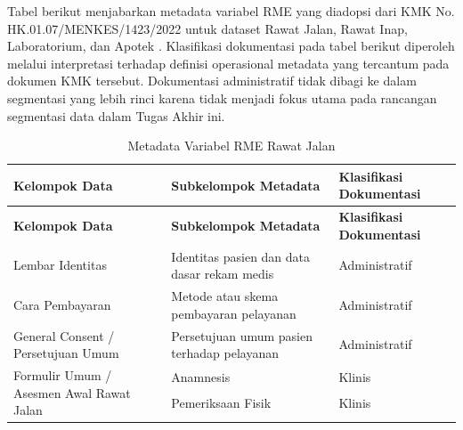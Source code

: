 \documentclass[bahasa, 12pt, a4paper, onecolumn, oneside, final]{report}
\begin{document}
Tabel berikut menjabarkan metadata variabel RME yang diadopsi dari KMK No. HK.01.07/MENKES/1423/2022 untuk dataset Rawat Jalan, Rawat Inap, Laboratorium, dan Apotek \autocite{kemenkes1423-2022}. Klasifikasi dokumentasi pada tabel berikut diperoleh melalui interpretasi terhadap definisi operasional metadata yang tercantum pada dokumen KMK tersebut. Dokumentasi administratif tidak dibagi ke dalam segmentasi yang lebih rinci karena tidak menjadi fokus utama pada rancangan segmentasi data dalam Tugas Akhir ini.

\begin{longtable}{|p{4cm}|p{5.2cm}|p{3.2cm}|}
	\caption{Metadata Variabel RME Rawat Jalan}
	\label{tab:metadata-rme-rawat-jalan}                                                                  \\
	\hline
	\textbf{Kelompok Data}        &
	\textbf{Subkelompok Metadata} &
	\textbf{Klasifikasi Dokumentasi}                                                                      \\ \hline
	\endfirsthead

	\hline
	\textbf{Kelompok Data}        &
	\textbf{Subkelompok Metadata} &
	\textbf{Klasifikasi Dokumentasi}                                                                      \\ \hline
	\endhead

	Lembar Identitas
	                              & Identitas pasien dan data dasar rekam medis
	                              & Administratif                                                         \\ \hline

	Cara Pembayaran
	                              & Metode atau skema pembayaran pelayanan
	                              & Administratif                                                         \\ \hline

	General Consent / Persetujuan Umum
	                              & Persetujuan umum pasien terhadap pelayanan
	                              & Administratif                                                         \\ \hline

	\multirow{3}{4cm}{Formulir Umum / Asesmen Awal Rawat Jalan}
	                              & Anamnesis
	                              & Klinis                                                                \\ \cline{2-3}

	                              & Pemeriksaan Fisik
	                              & Klinis                                                                \\ \cline{2-3}


\end{longtable}
\end{document}
